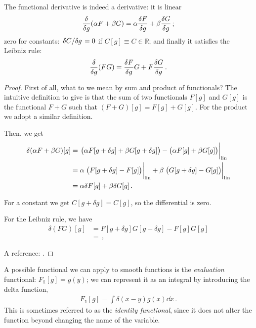 \documentclass[main.tex]{subfiles}
\begin{document}
\begin{claim}
The functional derivative is indeed a derivative: it is linear 
%
\begin{align}
\fdv{}{g} \qty(\alpha F + \beta  G) = \alpha \fdv{F}{g} + \beta \fdv{G}{g}
\,;
\end{align}
%
zero for constants: \(\fdv*{C}{g} = 0 \) if \(C[g] \equiv C \in \mathbb{R}\); and finally it satisfies the Leibniz rule: 
%
\begin{align}
\fdv{}{g} \qty(FG)= \fdv{F}{g} G + F \fdv{G}{g}
\,.
\end{align}
\end{claim}

\begin{proof}
First of all, what to we mean by sum and product of functionals? 
The intuitive definition to give is that the sum of two functionals \(F[g]\) and \(G[g]\) is the functional \(F+G\) such that \((F+G)[g] = F[g] + G[g]\).
For the product we adopt a similar definition. 

Then, we get 
%
\begin{subequations}
\begin{align}
\delta (\alpha F + \beta G)[g] &= \eval{\qty(\alpha F[g+ \delta g] + \beta G[g + \delta g]) - \qty(\alpha F[g] + \beta G[g])}_{\text{lin}}
\\
&= \alpha \eval{\qty(F[g + \delta g] - F[g])}_{\text{lin}} + \beta \eval{\qty(G [g + \delta g] - G[g])}_{\text{lin}}  \\
&= \alpha \delta F [g] + \beta \delta G[g]
\,.
\end{align}
\end{subequations}

For a constant we get \(C[g + \delta g] = C[g]\), so the differential is zero. 

For the Leibniz rule, we have 
%
\begin{subequations}
\begin{align}
\delta (FG)[g] &= F[g + \delta g] G[g + \delta g] - F[g] G[g]  \\
&= 
\,,
\end{align}
\end{subequations}
%

A reference: \cite[]{engelDensityFunctionalTheory2011}.
\end{proof}

A possible functional we can apply to smooth functions is the \emph{evaluation} functional: \(F_{\mathbb{1}}[g] = g(y )\); we can represent it as an integral by introducing the delta function, 
%
\begin{align}
F_{\mathbb{1}} [g]  = \int \delta (x - y) g(x) \dd{x}
\,.
\end{align}
%
This is sometimes referred to as the \emph{identity functional}, since it does not alter the function beyond changing the name of the variable.
\end{document}
